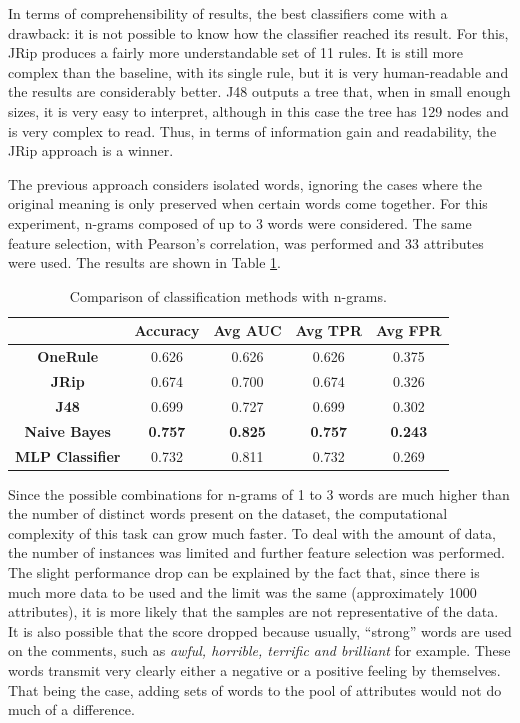 \documentclass{article}
\begin{document}
In terms of comprehensibility of results, the best classifiers come with a drawback: it is not possible to know how the classifier reached its result. For this, JRip produces a fairly more understandable set of 11 rules. It is still more complex than the baseline, with its single rule, but it is very human-readable and the results are considerably better. J48 outputs a tree that, when in small enough sizes, it is very easy to interpret, although in this case the tree has 129 nodes and is very complex to read. Thus, in terms of information gain and readability, the JRip approach is a winner.

The previous approach considers isolated words, ignoring the cases where the original meaning is only preserved when certain words come together. For this experiment, n-grams composed of up to 3 words were considered. The same feature selection, with Pearson's correlation, was performed and 33 attributes were used. The results are shown in Table \ref{tab:res2}.

\begin{table}[htpb]
    \centering
    \begin{tabular}{c|c|c|c|c}
         &  \textbf{Accuracy} & \textbf{Avg AUC} & \textbf{Avg TPR} & \textbf{Avg FPR} \\ \hline
         \textbf{OneRule} & 0.626 & 0.626 & 0.626 & 0.375 \\  
         \textbf{JRip} & 0.674 & 0.700 & 0.674 & 0.326 \\ 
         \textbf{J48} & 0.699 & 0.727 & 0.699 & 0.302 \\ 
         \textbf{Naive Bayes} & \textbf{0.757} & \textbf{0.825} & \textbf{0.757} & \textbf{0.243} \\
         \textbf{MLP Classifier} & 0.732 & 0.811 & 0.732 & 0.269 
    \end{tabular}
    \caption{Comparison of classification methods with n-grams.}
    \label{tab:res2}
\end{table}

Since the possible combinations for n-grams of 1 to 3 words are much higher than the number of distinct words present on the dataset, the computational complexity of this task can grow much faster. To deal with the amount of data, the number of instances was limited and further feature selection was performed. The slight performance drop can be explained by the fact that, since there is much more data to be used and the limit was the same (approximately 1000 attributes), it is more likely that the samples are not representative of the data. It is also possible that the score dropped because usually, ``strong'' words are used on the comments, such as \textit{awful, horrible, terrific and brilliant} for example. These words transmit very clearly either a negative or a positive feeling by themselves. That being the case, adding sets of words to the pool of attributes would not do much of a difference.
\end{document}
